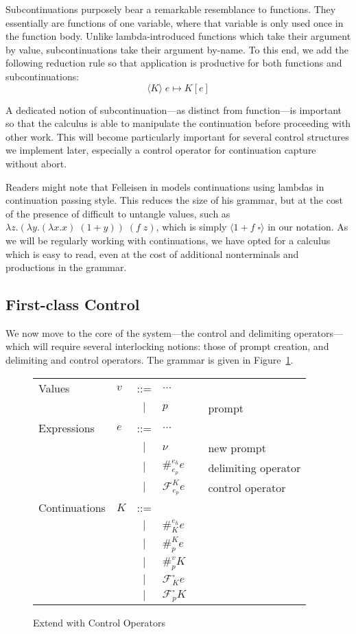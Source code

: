 \documentclass[11pt]{article}
\newcommand{\maybePage}{\newpage}
\newcommand\x{\lambda x}
\newcommand\F{\mathcal{F}}
\newcommand{\angles}[1]{\langle#1\rangle}
\begin{document}
Subcontinuations purposely bear a remarkable resemblance to functions.
They essentially are functions of one variable, where that variable is only used once in the function body.
Unlike lambda-introduced functions which take their argument by value, subcontinuations take their argument by-name.
To this end, we add the following reduction rule so that application is productive for both functions and subcontinuations:
$$\angles{K}\;e \mapsto K[e]$$

A dedicated notion of subcontinuation---as distinct from function---is important so that the calculus is able to manipulate the continuation before proceeding with other work.
This will become particularly important for several control structures we implement later, especially a control operator for continuation capture without abort.

Readers might note that Felleisen in \cite{PromptApplication} models continuations using lambdas in continuation passing style.
This reduces the size of his grammar, but at the cost of the presence of difficult to untangle values, such as $\lambda z.(\lambda y.(\x.x)\;(1+y))\;(f\;z)$, which is simply $\angles{1 + f\;\square}$ in our notation.
As we will be regularly working with continuations, we have opted for a calculus which is easy to read, even at the cost of additional nonterminals and productions in the grammar.


\maybePage
\subsection{First-class Control}

We now move to the core of the system---the control and delimiting operators---which will require several interlocking notions:
those of prompt creation, and delimiting and control operators.
The grammar is given in Figure~\ref{fig:addControl}.

\begin{figure}[H]
\caption{Extend with Control Operators}
\label{fig:addControl}

\begin{tabular}{llclll}
Values & $v$ & ::= & $\ldots$ \\
& & $|$ & $p$ && prompt \\
Expressions & $e$ & ::= & $\ldots$ \\
& & $|$ & $\nu$ && new prompt \\
& & $|$ & $\#_{e_p}^{e_h}e$ && delimiting operator \\
& & $|$ & $\F_{e_p}^Ke$ && control operator \\
Continuations & $K$ & ::= & \\
& & $|$ & $\#_{K}^{e_h}e$ &&  \\
& & $|$ & $\#_{p}^{K}e$ &&  \\
& & $|$ & $\#_{p}^{v}K$ &&  \\
& & $|$ & $\F_{K}^{\square}e$ &&  \\
& & $|$ & $\F_{p}^{\square}K$ &&  \\
\end{tabular}
\end{figure}
\end{document}
